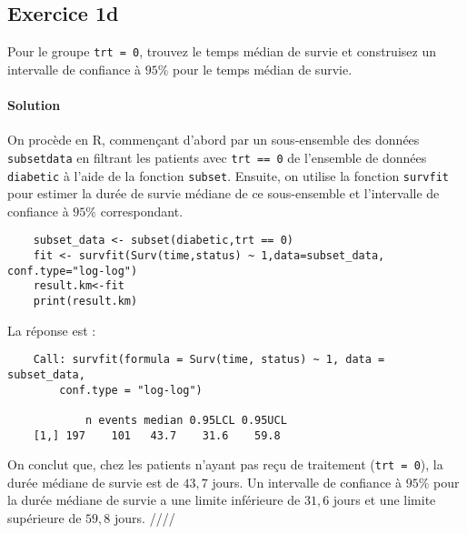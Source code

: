 \documentclass[../main.tex]{subfiles}
\begin{document}
\begin{CJK*}{UTF8}{gbsn}

\section*{Exercice 1d}
Pour le groupe \texttt{trt = 0}, trouvez le temps médian de survie et
construisez un intervalle de confiance à $95\%$ pour le temps médian de survie.
    
\paragraph{Solution}

On procède en R, commençant 
d'abord par un sous-ensemble des données \texttt{subsetdata} 
en filtrant les patients avec \texttt{trt == 0} de l'ensemble de données 
\texttt{diabetic} à l'aide de la fonction \texttt{subset}.
Ensuite, on utilise la fonction \texttt{survfit} 
pour estimer la durée de survie médiane de ce sous-ensemble 
et l'intervalle de confiance à $95\%$ correspondant.

\begin{lstlisting}
    subset_data <- subset(diabetic,trt == 0)
    fit <- survfit(Surv(time,status) ~ 1,data=subset_data, conf.type="log-log")
    result.km<-fit
    print(result.km)
\end{lstlisting}
    
La réponse est :
    
\begin{lstlisting}
    Call: survfit(formula = Surv(time, status) ~ 1, data = subset_data, 
        conf.type = "log-log")
        
            n events median 0.95LCL 0.95UCL
    [1,] 197    101   43.7    31.6    59.8
\end{lstlisting}

On conclut que, chez les patients n'ayant pas reçu de traitement
(\texttt{trt = 0}), la durée médiane de survie est de $43,7$ jours.
Un intervalle de confiance à $95\%$ pour la durée médiane de survie 
a une limite inférieure de $31,6$ jours et une limite supérieure de $59,8$ jours. ////

\end{CJK*}
\end{document}
